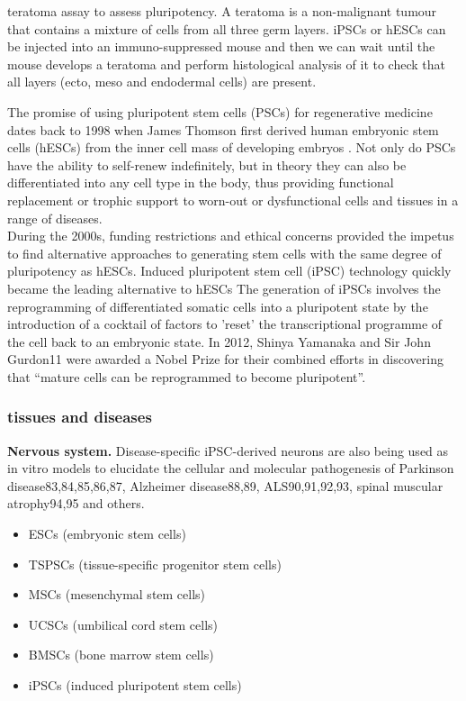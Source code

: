 teratoma assay to assess pluripotency.
A teratoma is a non-malignant tumour that contains a mixture of cells from all three germ layers.
iPSCs or hESCs can be injected into an immuno-suppressed mouse and then we can wait until the mouse develops a teratoma and perform histological analysis of it to check that all layers (ecto, meso and endodermal cells) are present.


The promise of using pluripotent stem cells (PSCs) for regenerative medicine dates back to 1998 when James Thomson \cite{thomson1998embryonic} first derived human embryonic stem cells (hESCs) from the inner cell mass of developing embryos \cite{kimbrel2015current}.
Not only do PSCs have the ability to self-renew indefinitely, but in theory they can also be differentiated into any cell type in the body, thus providing functional replacement or trophic support to worn-out or dysfunctional cells and tissues in a range of diseases. \\

During the 2000s, funding restrictions and ethical concerns provided the impetus to find alternative approaches to generating stem cells with the same degree of pluripotency as hESCs. 
Induced pluripotent stem cell (iPSC) technology quickly became the leading alternative to hESCs \cite{takahashi2006induction, takahashi2007induction, yu2007induced}
The generation of iPSCs involves the reprogramming of differentiated somatic cells into a pluripotent state by the introduction of a cocktail of factors to 'reset' the transcriptional programme of the cell back to an embryonic state. 
In 2012, Shinya Yamanaka and Sir John Gurdon11 were awarded a Nobel Prize for their combined efforts in discovering that “mature cells can be reprogrammed to become pluripotent”. 

\subsubsection{tissues and diseases}

\textbf{Nervous system.}
Disease-specific iPSC-derived neurons are also being used as in vitro models to elucidate the cellular and molecular pathogenesis of Parkinson disease83,84,85,86,87, Alzheimer disease88,89, ALS90,91,92,93, spinal muscular atrophy94,95 and others.


\begin{itemize}
    \item ESCs (embryonic stem cells)
    \item TSPSCs (tissue-specific progenitor stem cells)
    \item MSCs (mesenchymal stem cells)
    \item UCSCs (umbilical cord stem cells)
    \item BMSCs (bone marrow stem cells)
    \item iPSCs (induced pluripotent stem cells)
\end{itemize}

